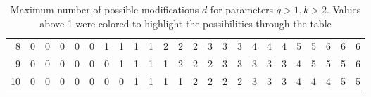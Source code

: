 \begin{table}[ht]
\begin{tabular}{|r|rrrrrrrrrrrrrrrrrrrrrrr}
8                                                 & \cellcolor[HTML]{FFFFFF}0       & \cellcolor[HTML]{FFFFFF}0       & \cellcolor[HTML]{FFFFFF}0       & \cellcolor[HTML]{FFFFFF}0       & \cellcolor[HTML]{FFFFFF}0       & \cellcolor[HTML]{FFFFFF}1       & \cellcolor[HTML]{FFFFFF}1       & \cellcolor[HTML]{FFFFFF}1        & \cellcolor[HTML]{FFFFFF}1        & \cellcolor[HTML]{FBEAE8}2        & \cellcolor[HTML]{FBEAE8}2        & \cellcolor[HTML]{FBEAE8}2        & \cellcolor[HTML]{F7D4D1}3        & \cellcolor[HTML]{F7D4D1}3        & \cellcolor[HTML]{F7D4D1}3        & \cellcolor[HTML]{F3BEB9}4  & \cellcolor[HTML]{F3BEB9}4  & \cellcolor[HTML]{F3BEB9}4  & \cellcolor[HTML]{F3BAB5}5  & \cellcolor[HTML]{F3BAB5}5  & \cellcolor[HTML]{F3B5B0}6  & \cellcolor[HTML]{F3B5B0}6  & \cellcolor[HTML]{F3B5B0}6  \\ \cline{1-1}
9                                                 & \cellcolor[HTML]{FFFFFF}0       & \cellcolor[HTML]{FFFFFF}0       & \cellcolor[HTML]{FFFFFF}0       & \cellcolor[HTML]{FFFFFF}0       & \cellcolor[HTML]{FFFFFF}0       & \cellcolor[HTML]{FFFFFF}0       & \cellcolor[HTML]{FFFFFF}1       & \cellcolor[HTML]{FFFFFF}1        & \cellcolor[HTML]{FFFFFF}1        & \cellcolor[HTML]{FFFFFF}1        & \cellcolor[HTML]{FBEAE8}2        & \cellcolor[HTML]{FBEAE8}2        & \cellcolor[HTML]{FBEAE8}2        & \cellcolor[HTML]{F7D4D1}3        & \cellcolor[HTML]{F7D4D1}3        & \cellcolor[HTML]{F7D4D1}3  & \cellcolor[HTML]{F7D4D1}3  & \cellcolor[HTML]{F7D4D1}3  & \cellcolor[HTML]{F3BEB9}4  & \cellcolor[HTML]{F3BAB5}5  & \cellcolor[HTML]{F3BAB5}5  & \cellcolor[HTML]{F3BAB5}5  & \cellcolor[HTML]{F3B5B0}6  \\ \cline{1-1}
10                                                & \cellcolor[HTML]{FFFFFF}0       & \cellcolor[HTML]{FFFFFF}0       & \cellcolor[HTML]{FFFFFF}0       & \cellcolor[HTML]{FFFFFF}0       & \cellcolor[HTML]{FFFFFF}0       & \cellcolor[HTML]{FFFFFF}0       & \cellcolor[HTML]{FFFFFF}0       & \cellcolor[HTML]{FFFFFF}1        & \cellcolor[HTML]{FFFFFF}1        & \cellcolor[HTML]{FFFFFF}1        & \cellcolor[HTML]{FFFFFF}1        & \cellcolor[HTML]{FBEAE8}2        & \cellcolor[HTML]{FBEAE8}2        & \cellcolor[HTML]{FBEAE8}2        & \cellcolor[HTML]{FBEAE8}2        & \cellcolor[HTML]{F7D4D1}3  & \cellcolor[HTML]{F7D4D1}3  & \cellcolor[HTML]{F7D4D1}3  & \cellcolor[HTML]{F3BEB9}4  & \cellcolor[HTML]{F3BEB9}4  & \cellcolor[HTML]{F3BEB9}4  & \cellcolor[HTML]{F3BAB5}5  & \cellcolor[HTML]{F3BAB5}5  \\ \cline{1-1}
\end{tabular}
    \caption{Maximum number of possible modifications $d$ for parameters $q > 1, k > 2$. Values above 1 were colored to highlight the possibilities through the table}
    \label{table:d-polynomial-cff-q-k-horizontal}
\end{table}